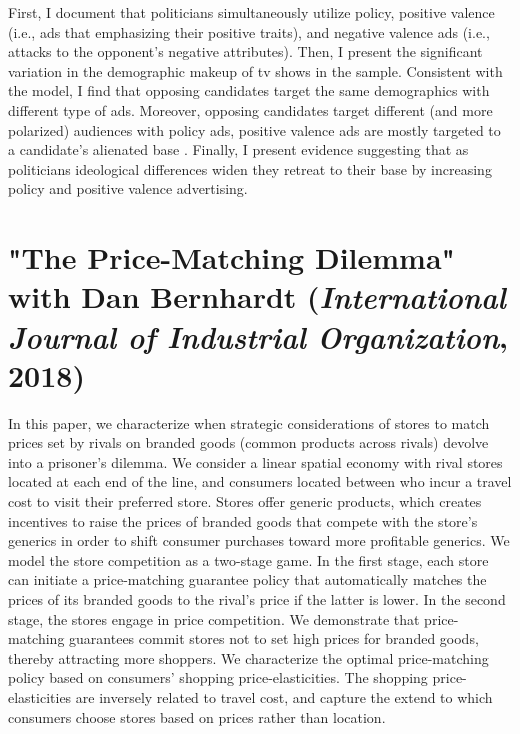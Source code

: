 \documentclass[12pt]{article}
\begin{document}
First, I document that politicians simultaneously utilize policy, positive valence (i.e., ads that emphasizing their positive traits), and negative valence ads (i.e., attacks to the opponent's negative attributes).
Then, I present the significant variation in the demographic makeup of tv shows in the sample. 
Consistent with the model, I find that opposing candidates target the same demographics with different type of ads.
Moreover, opposing candidates target different (and more polarized) audiences with policy ads, positive valence ads are mostly targeted to a candidate’s alienated base .
Finally, I present evidence suggesting that as politicians ideological differences widen they retreat to their base by increasing policy and positive valence advertising.






\vspace{0.25cm}
\section{"The Price-Matching Dilemma" with Dan Bernhardt (\emph{International Journal of Industrial Organization}, 2018)}
\label{sec:orge4a4c0f}
\vspace{0.1cm}

\noindent In this paper, we characterize when strategic considerations of stores to match prices set by rivals on branded goods (common products across rivals) devolve into a prisoner’s dilemma.
We consider a linear spatial economy with rival stores located at each end of the line, and consumers located between who incur a travel cost to visit their preferred store.
Stores offer generic products, which creates incentives to raise the prices of branded goods that compete with the store's generics in order to shift consumer purchases toward more profitable generics.
We model the store competition as a two-stage game.
In the first stage, each store can initiate a price-matching guarantee policy that automatically matches the prices of its branded goods to the rival's price if the latter is lower.
In the second stage, the stores engage in price competition.
We demonstrate that price-matching guarantees commit stores not to set high prices for branded goods, thereby attracting more shoppers.
We characterize the optimal price-matching policy based on consumers' shopping price-elasticities.
The shopping price-elasticities are inversely related to travel cost, and capture the extend to which consumers choose stores based on prices rather than location.
\end{document}

